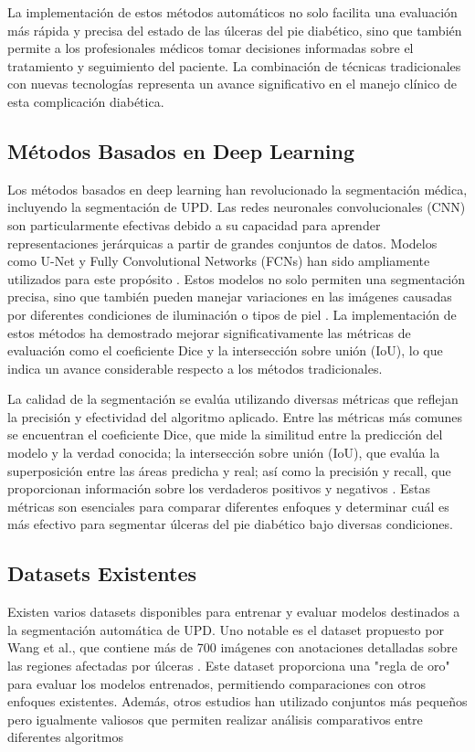 \documentclass[12pt]{article}
\begin{document}
	La implementación de estos métodos automáticos no solo facilita una evaluación más rápida y precisa del estado de las úlceras del pie diabético, sino que también permite a los profesionales médicos tomar decisiones informadas sobre el tratamiento y seguimiento del paciente. La combinación de técnicas tradicionales con nuevas tecnologías representa un avance significativo en el manejo clínico de esta complicación diabética.
		
		\subsection{Métodos Basados en Deep Learning}
		
		Los métodos basados en deep learning han revolucionado la segmentación médica, incluyendo la segmentación de UPD. Las redes neuronales convolucionales (CNN) son particularmente efectivas debido a su capacidad para aprender representaciones jerárquicas a partir de grandes conjuntos de datos. Modelos como U-Net y Fully Convolutional Networks (FCNs) han sido ampliamente utilizados para este propósito \cite{Gomez2021}. Estos modelos no solo permiten una segmentación precisa, sino que también pueden manejar variaciones en las imágenes causadas por diferentes condiciones de iluminación o tipos de piel \cite{Wang2020}. La implementación de estos métodos ha demostrado mejorar significativamente las métricas de evaluación como el coeficiente Dice y la intersección sobre unión (IoU), lo que indica un avance considerable respecto a los métodos tradicionales.
		
		La calidad de la segmentación se evalúa utilizando diversas métricas que reflejan la precisión y efectividad del algoritmo aplicado. Entre las métricas más comunes se encuentran el coeficiente Dice, que mide la similitud entre la predicción del modelo y la verdad conocida; la intersección sobre unión (IoU), que evalúa la superposición entre las áreas predicha y real; así como la precisión y recall, que proporcionan información sobre los verdaderos positivos y negativos \cite{BVS2019}. Estas métricas son esenciales para comparar diferentes enfoques y determinar cuál es más efectivo para segmentar úlceras del pie diabético bajo diversas condiciones.
		
		
		\subsection{Datasets Existentes}
		Existen varios datasets disponibles para entrenar y evaluar modelos destinados a la segmentación automática de UPD. Uno notable es el dataset propuesto por Wang et al., que contiene más de 700 imágenes con anotaciones detalladas sobre las regiones afectadas por úlceras \cite{Wang2020}. Este dataset proporciona una "regla de oro" para evaluar los modelos entrenados, permitiendo comparaciones con otros enfoques existentes. Además, otros estudios han utilizado conjuntos más pequeños pero igualmente valiosos que permiten realizar análisis comparativos entre diferentes algoritmos \cite{Gomez2021}
		
\end{document}
